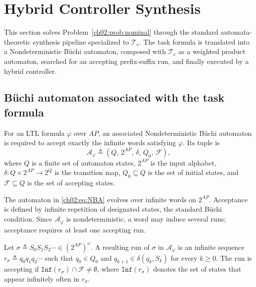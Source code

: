 \section{Hybrid Controller Synthesis}
\label{ch02:sec:solution}

This section solves Problem~\ref{ch02:prob:nominal} through the standard
automata-theoretic synthesis pipeline specialized to $\mathcal{T}_c$. The task
formula is translated into a Nondeterministic B\"uchi automaton, composed with
$\mathcal{T}_c$ as a weighted product automaton, searched for an accepting
prefix-suffix run, and finally executed by a hybrid controller.

\subsection{B\"uchi automaton associated with the task formula}
\label{ch02:subsec:NBA}


\begin{definition}
\label{ch02:def:NBA}
\begin{revision}
For an LTL formula $\varphi$ over $AP$, an associated Nondeterministic
B\"uchi automaton is required to accept exactly the infinite words
satisfying $\varphi$.
Its tuple is
\begin{equation}
\mathcal{A}_{\varphi} \triangleq
\left(Q,\,2^{AP},\,\delta,\,Q_0,\,\mathcal{F}\right),
\label{ch02:eq:NBA}
\end{equation}
where $Q$ is a finite set of automaton states, $2^{AP}$ is the input alphabet,
$\delta : Q \times 2^{AP} \to 2^{Q}$ is the transition map,
$Q_0 \subseteq Q$ is the set of initial states, and
$\mathcal{F} \subseteq Q$ is the set of accepting states.
\end{revision}
\end{definition}

The automaton in \eqref{ch02:eq:NBA} evolves over infinite words on
$2^{AP}$. Acceptance is defined by infinite repetition of designated states,
the standard B\"uchi condition.
Since $\mathcal{A}_{\varphi}$ is nondeterministic, a word may induce several
runs; acceptance requires at least one accepting run.

\begin{definition}
\label{ch02:def:buchi_run}
Let
$\sigma \triangleq S_0S_1S_2\cdots \in (2^{AP})^{\omega}$.
A resulting run of $\sigma$ in $\mathcal{A}_{\varphi}$ is an infinite sequence
$r_{\sigma} \triangleq q_0q_1q_2\cdots$ such that
$q_0 \in Q_0$
and
$q_{k+1} \in \delta(q_k,S_k)$
for every $k \geq 0$. The run is accepting if
$\texttt{Inf}(r_{\sigma}) \cap \mathcal{F} \neq \emptyset$,
where $\texttt{Inf}(r_{\sigma})$ denotes the set of states that appear
infinitely often in $r_{\sigma}$.
\end{definition}

